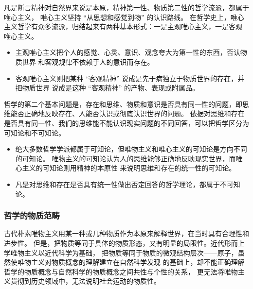 \documentclass[11pt, UTF8]{book} %
\begin{document}
{\begin{mdframed}[frametitle={哲学的基本问题及其派别分类}]
    
    凡是断言精神对自然界来说是本原，精神第一性、物质第二性的哲学流派，都属于唯心主义，
    唯心主义坚持 “从思想和感觉到物” 的认识路线。
    在哲学史上，唯心主义哲学有众多流派，归结起来有两种基本形式：一是主观唯心主义，一是客观
    唯心主义。
    \begin{itemize}[itemsep=0pt]
        \item 主观唯心主义把个人的感觉、心灵、意识、观念夸大为第一性的东西，否认物质世界
        和客观规律不依赖于人的意识而存在。
        \item 客观唯心主义则把某种 “客观精神” 说成是先于病独立于物质世界的存在，并把物质世界
        说成是这种 “客观精神” 的产物、表现或附属品。
    \end{itemize}
    
    哲学的第二个基本问题是，存在和思维、物质和意识是否具有同一性的问题，即思维能否正确地反映存在、人能否认识或彻底认识世界的问题。
    依据对思维和存在是否具有同一性、我们的思维能不能认识现实问题的不同回答，可以把哲学区分为
    可知论和不可知论。
    \begin{itemize}[itemsep=0pt]
        \item 绝大多数哲学学派都属于可知论，但唯物主义和唯心主义的可知论是方向不同的可知论。
        唯物主义的可知论认为人的思维能够正确地反映现实世界，而唯心主义的可知论则用精神的本原性
        来说明思维和存在的统一性的可知论。
        \item 凡是对思维和存在是否具有统一性做出否定回答的哲学理论，都属于不可知论。
    \end{itemize}
\end{mdframed}}

\subsubsection{哲学的物质范畴}

古代朴素唯物主义用某一种或几种物质作为本原来解释世界，在当时具有合理性和进步性。
但是，把物质等同于具体的物质形态，又有明显的局限性。近代形而上学唯物主义以近代科学为基础，
把物质等同于物质的微观结构层次——原子，虽然使唯物主义对物质概念的理解建立在自然科学发现
的基础上，却不能正确理解哲学的物质概念与自然科学的物质概念之间共性与个性的关系，
更无法将唯物主义贯彻到历史领域中，无法说明社会运动的物质性。
\end{document}
